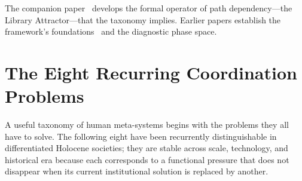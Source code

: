 \documentclass[12pt,a4paper]{article}
\begin{document}
The companion paper~\cite{mckern2026library} develops the formal operator of path dependency---the Library Attractor---that the taxonomy implies. Earlier papers establish the framework's foundations~\cite{mckern2026paper1} and the diagnostic phase space.

\section{The Eight Recurring Coordination Problems}

A useful taxonomy of human meta-systems begins with the problems they all have to solve. The following eight have been recurrently distinguishable in differentiated Holocene societies; they are stable across scale, technology, and historical era because each corresponds to a functional pressure that does not disappear when its current institutional solution is replaced by another.
\end{document}

